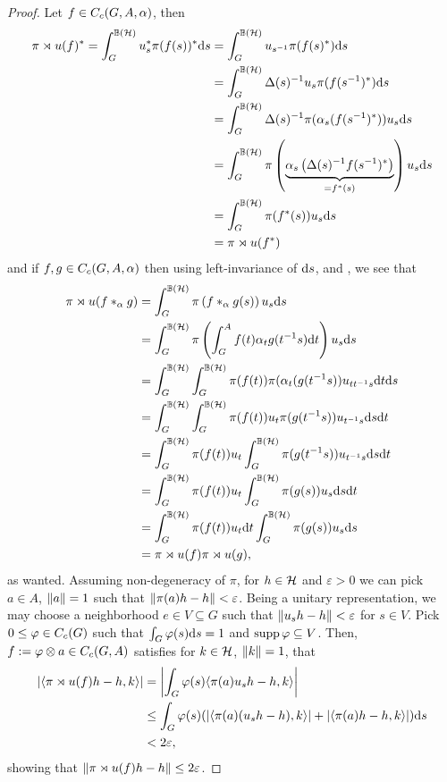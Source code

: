 \begin{proof}
Let $f \in C_c(G,A,\alpha)$, then
\begin{align*}
	\pi \rtimes u(f)^* = \int_G^{\mathbb{B}(\mathcal{H})}  u_s^* \pi(f(s))^* \mathrm{d} s &= \int_G^{\mathbb{B}(\mathcal{H})} u_{s^{-1}} \pi(f(s)^*) \mathrm{d} s\\
	&= \int_G^{\mathbb{B}(\mathcal{H})} \Delta(s)^{-1} u_{s} \pi(f(s^{-1})^*) \mathrm{d} s \\
	&= \int_G^{\mathbb{B}(\mathcal{H})} \Delta(s)^{-1} \pi(\alpha_s(f(s^{-1})^*)) u_s \mathrm{d} s\\
	&= \int_G^{\mathbb{B}(\mathcal{H})} \pi\left( \underbrace{\alpha_s\left( \Delta(s)^{-1}f(s^{-1})^* \right)}_{=f^*(s)} \right) u_s \mathrm{d} s\\
	&= \int_G^{\mathbb{B}(\mathcal{H})} \pi(f^*(s)) u_s \mathrm{d} s\\
	&= \pi \rtimes u(f^*)
\end{align*}
and if $f,g \in C_c(G,A,\alpha)$ then using left-invariance of $\mathrm{d} s$,  and , we see that
\begin{align*}
	\pi \rtimes u(f\ast_{\alpha}g) &= \int_G^{\mathbb{B}(\mathcal{H})} \pi \left( f \ast_\alpha g(s) \right)u_s \mathrm{d} s\\
	&= \int_G^{\mathbb{B}(\mathcal{H})} \pi\left( \int_G^A f(t) \alpha_t g(t^{-1}s) \mathrm{d} t \right)u_s \mathrm{d} s\\
	&= \int_G^{\mathbb{B}(\mathcal{H})}\int_G^{\mathbb{B}(\mathcal{H})} \pi(f(t)) \pi(\alpha_t(g(t^{-1}s))u_{t t^{-1}s} \mathrm{d} t \mathrm{d} s\\
	&= \int_G^{\mathbb{B}(\mathcal{H})} \int_G ^{\mathbb{B}(\mathcal{H})} \pi(f(t)) u_t \pi(g(t^{-1}s)) u_{t^{-1}s}\mathrm{d} s \mathrm{d} t\\
	&= \int_G^{\mathbb{B}(\mathcal{H})} \pi(f(t)) u_t \int_G^{\mathbb{B}(\mathcal{H})} \pi(g(t^{-1}s )) u_{t^{-1}s} \mathrm{d} s \mathrm{d} t\\
	&= \int_G ^{\mathbb{B}(\mathcal{H})} \pi(f(t)) u_t \int_G ^{\mathbb{B}(\mathcal{H})} \pi(g(s)) u_s \mathrm{d} s \mathrm{d} t\\
	&= \int_G ^{\mathbb{B}(\mathcal{H})} \pi(f(t)) u_t \mathrm{d} t \int_G ^{\mathbb{B}(\mathcal{H})} \pi(g(s)) u_s \mathrm{d} s \\
	&= \pi \rtimes u (f) \pi\rtimes u (g),
\end{align*}
as wanted. Assuming non-degeneracy of $\pi$, for $h \in \mathcal{H}$ and $\varepsilon>0$ we can pick $a \in A$, $\left\lVert a \right\rVert =1$ such that $\left\lVert \pi(a) h - h \right\rVert < \varepsilon$. Being a unitary representation, we may choose a neighborhood $e \in V \subseteq G$ such that $\left\lVert u_s h - h\right\rVert < \varepsilon$ for $s \in V$. Pick $0 \leq \varphi \in C_c(G)$ such that $\int_G \varphi(s) \mathrm{d} s = 1$ and $\operatorname{supp} \varphi \subseteq V$. Then, $f := \varphi \otimes a \in C_c(G,A)$ satisfies for $k \in \mathcal{H}$, $\left\lVert k \right\rVert = 1$, that
\begin{align*}
\left| \langle \pi \rtimes u(f)h-h,k\rangle \right| &= 	\left| \int_G \varphi(s) \langle \pi(a)u_s h-h,k \rangle\right|\\
& \leq \int_G \varphi(s) (|\langle \pi(a) (u_s h-h),k\rangle|+|\langle \pi(a)h-h,k\rangle| ) \mathrm{d} s \\
&< 2 \varepsilon,
\end{align*}
showing that $\left\lVert \pi \rtimes u(f)h-h\right\rVert \leq 2 \varepsilon$.
\end{proof}

